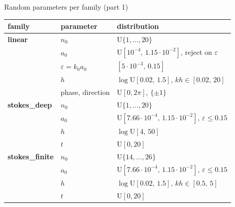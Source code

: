 \documentclass[aspectratio=169,11pt]{beamer}
\begin{document}
\begin{frame}{Random parameters per family (part 1)}

\scriptsize
\renewcommand{\arraystretch}{0.95}
\begin{tabular}{lll}
\toprule
family & parameter & distribution \\
\midrule
\textbf{linear}     & $n_0$              & $\mathrm{U}\{1, \ldots, 20\}$ \\
                    & $a_0$              & $\mathrm{U}[10^{-4},\,1.15\cdot 10^{-2}]$, reject on $\varepsilon$ \\
                    & $\varepsilon = k_0 a_0$ & $[5\cdot 10^{-3},\,0.15]$ \\
                    & $h$                & $\log\mathrm{U}[0.02,\,1.5]$, $kh \in [0.02,\,20]$ \\
                    & phase, direction   & $\mathrm{U}[0, 2\pi]$, $\{\pm 1\}$ \\
\midrule
\textbf{stokes\_deep}   & $n_0$               & $\mathrm{U}\{1, \ldots, 20\}$ \\
                        & $a_0$               & $\mathrm{U}[7.66\cdot 10^{-4},\,1.15\cdot 10^{-2}]$, $\varepsilon \le 0.15$ \\
                        & $h$                 & $\log\mathrm{U}[4,\,50]$ \\
                        & $t$                 & $\mathrm{U}[0, 20]$ \\
\midrule
\textbf{stokes\_finite} & $n_0$               & $\mathrm{U}\{14, \ldots, 26\}$ \\
                        & $a_0$               & $\mathrm{U}[7.66\cdot 10^{-4},\,1.15\cdot 10^{-2}]$, $\varepsilon \le 0.15$ \\
                        & $h$                 & $\log\mathrm{U}[0.02,\,1.5]$, $kh \in [0.5,\,5]$ \\
                        & $t$                 & $\mathrm{U}[0, 20]$ \\
\bottomrule
\end{tabular}

\vspace{0.2em}
\scriptsize
\end{frame}
\end{document}
